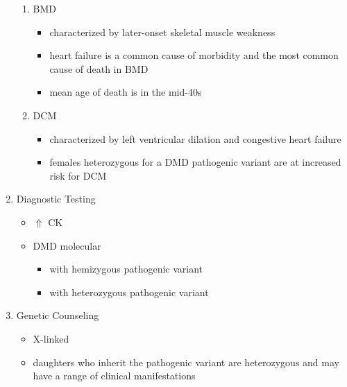 \documentclass[12pt]{scrartcl}
\begin{document}
\begin{enumerate}
\begin{enumerate}
\item BMD
\label{sec:org148f6f4}
\begin{itemize}
\item characterized by later-onset skeletal muscle weakness
\item heart failure is a common cause of morbidity and the most common
cause of death in BMD
\item mean age of death is in the mid-40s
\end{itemize}
\item DCM
\label{sec:org44c689a}
\begin{itemize}
\item characterized by left ventricular dilation and congestive heart
failure
\item females heterozygous for a DMD pathogenic variant are at increased
risk for DCM
\end{itemize}
\end{enumerate}
\item Diagnostic Testing
\label{sec:org4f736a9}
\begin{itemize}
\item \(\Uparrow\) CK
\item DMD molecular
\begin{itemize}
\item \male with hemizygous pathogenic variant
\item \female with heterozygous pathogenic variant
\end{itemize}
\end{itemize}
\item Genetic Counseling
\label{sec:org82a60f3}
\begin{itemize}
\item X-linked
\item daughters who inherit the pathogenic variant are heterozygous and
may have a range of clinical manifestations
\end{itemize}
\end{enumerate}
\end{document}

